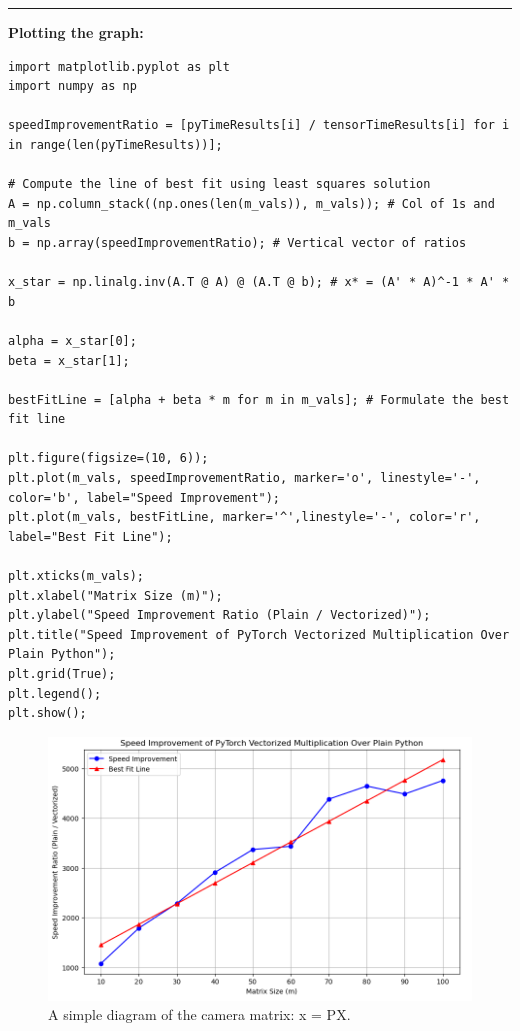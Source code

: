 \documentclass[12pt]{article}
\begin{document}
\noindent\rule{\textwidth}{0.4pt}
\noindent\textbf{Plotting the graph:}
\begin{lstlisting}
import matplotlib.pyplot as plt
import numpy as np

speedImprovementRatio = [pyTimeResults[i] / tensorTimeResults[i] for i in range(len(pyTimeResults))];

# Compute the line of best fit using least squares solution
A = np.column_stack((np.ones(len(m_vals)), m_vals)); # Col of 1s and m_vals
b = np.array(speedImprovementRatio); # Vertical vector of ratios

x_star = np.linalg.inv(A.T @ A) @ (A.T @ b); # x* = (A' * A)^-1 * A' * b

alpha = x_star[0];
beta = x_star[1];

bestFitLine = [alpha + beta * m for m in m_vals]; # Formulate the best fit line

plt.figure(figsize=(10, 6));
plt.plot(m_vals, speedImprovementRatio, marker='o', linestyle='-', color='b', label="Speed Improvement");
plt.plot(m_vals, bestFitLine, marker='^',linestyle='-', color='r', label="Best Fit Line");

plt.xticks(m_vals);
plt.xlabel("Matrix Size (m)");
plt.ylabel("Speed Improvement Ratio (Plain / Vectorized)");
plt.title("Speed Improvement of PyTorch Vectorized Multiplication Over Plain Python");
plt.grid(True);
plt.legend();
plt.show();
\end{lstlisting}

\newpage

\begin{figure}[ht]
    \centering
    \includegraphics[width=1\linewidth]{PythonVSPyTorch.PNG}
    \caption{A simple diagram of the camera matrix: x = PX.}
\end{figure}
\end{document}
